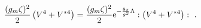 \begin{equation}
{(g_m\zeta)^2\over 2}\left(V^4+V^{*4}\right)={(g_m\zeta)^2\over 2} {\rm e}^{-{8\pi
\over g^2}\Lambda}:\left(V^4+V^{*4}\right):~ .
\end{equation}

